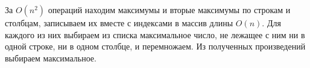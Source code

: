\documentclass{article}
\begin{document}
За $O(n^2)$ операций находим максимумы и вторые максимумы по строкам и столбцам, записываем их вместе с индексами в массив длины $O(n)$. Для каждого из них выбираем из списка максимальное число, не лежащее с ним ни в одной строке, ни в одном столбце, и перемножаем. Из полученных произведений выбираем максимальное.
\end{document}
